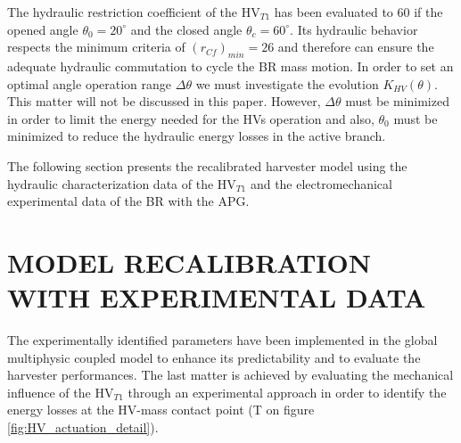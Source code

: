 \documentclass[3p,twocolumn,preprint]{elsarticle}
\begin{document}
The hydraulic restriction coefficient of the HV$_{T1}$ has been evaluated to 60 if the opened angle $\theta_0=20^{\circ}$ and the closed angle $\theta_c = 60^{\circ}$. Its hydraulic behavior respects the minimum criteria of \mbox{$(r_{Cf})_{min}=26$} and therefore can ensure the adequate hydraulic commutation to cycle the BR mass motion. In order to set an optimal angle operation range $\Delta\theta$ we must investigate the evolution $K_{HV}(\theta)$. This matter will not be discussed in this paper. However, $\Delta\theta$ must be minimized in order to limit the energy needed for the HVs operation and also, $\theta_0$ must be minimized to reduce the hydraulic energy losses in the active branch.

The following section presents the recalibrated harvester model using the hydraulic characterization data of the HV$_{T1}$ and the electromechanical experimental data of the BR with the APG.

\section{MODEL RECALIBRATION WITH EXPERIMENTAL DATA}
\label{sec:MODEL RECALIBRATION WITH EXPERIMENTAL DATA}

The experimentally identified parameters have been implemented in the global multiphysic coupled model to enhance its predictability and to evaluate the harvester performances. The last matter is achieved by evaluating the mechanical influence of the HV$_{T1}$ through an experimental approach in order to identify the energy losses at the HV-mass contact point (T on figure \ref{fig:HV_actuation_detail}). 

\end{document}
